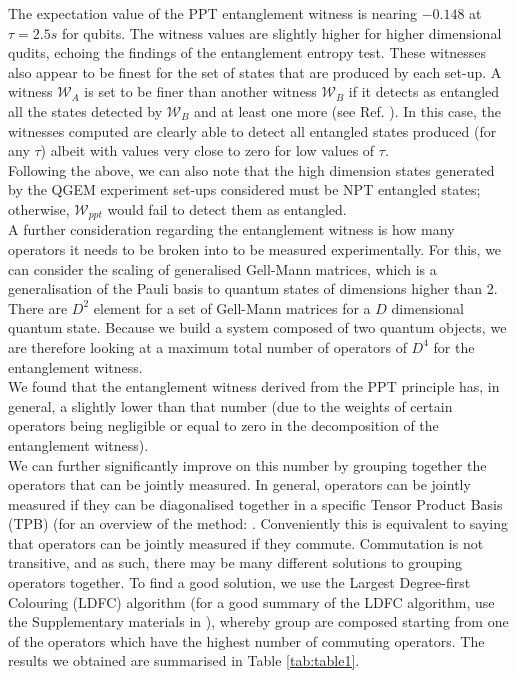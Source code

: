 \documentclass[%
 12pt,
 superscriptaddress,
 amsmath,
 amssymb,
 onecolumn,
 longbibliography
]{revtex4-2}
\begin{document}
\indent The expectation value of the PPT entanglement witness is nearing $-0.148$ at $\tau=2.5s$ for qubits. The witness values are slightly higher for higher dimensional qudits, echoing the findings of the entanglement entropy test. These witnesses also appear to be finest for the set of states that are produced by each set-up. A witness $\mathcal{W}_A$ is set to be finer than another witness $\mathcal{W}_B$ if it detects as entangled all the states detected by $\mathcal{W}_B$ and at least one more (see Ref. \cite{Lewenstein2000}). In this case, the witnesses computed are clearly able to detect all entangled states produced (for any $\tau$) albeit with values very close to zero for low values of $\tau$. \\
\indent Following the above, we can also note that the high dimension states generated by the QGEM experiment set-ups considered must be NPT entangled states; otherwise, $\mathcal{W}_{ppt}$ would fail to detect them as entangled. \\
\indent A further consideration regarding the entanglement witness is how many operators it needs to be broken into to be measured experimentally. For this, we can consider the scaling of generalised Gell-Mann matrices, which is a generalisation of the Pauli basis to quantum states of dimensions higher than 2. There are $D^2$ element for a set of Gell-Mann matrices for a $D$ dimensional quantum state. Because we build a system composed of two quantum objects, we are therefore looking at a maximum total number of operators of $D^4$ for the entanglement witness. \\
\indent We found that the entanglement witness derived from the PPT principle has, in general, a slightly lower than that number (due to the weights of certain operators being negligible or equal to zero in the decomposition of the entanglement witness). \\
\indent We can further significantly improve on this number by grouping together the operators that can be jointly measured. In general, operators can be jointly measured if they can be diagonalised together in a specific Tensor Product Basis (TPB) (for an overview of the method: \cite{Gokhale2019}. Conveniently this is equivalent to saying that operators can be jointly measured if they commute. Commutation is not transitive, and as such, there may be many different solutions to grouping operators together. To find a good solution, we use the Largest Degree-first Colouring (LDFC) algorithm (for a good summary of the LDFC algorithm, use the Supplementary materials in \cite{Hamamura2020}), whereby group are composed starting from one of the operators which have the highest number of commuting operators. The results we obtained are summarised in Table \ref{tab:table1}. \\
\end{document}
